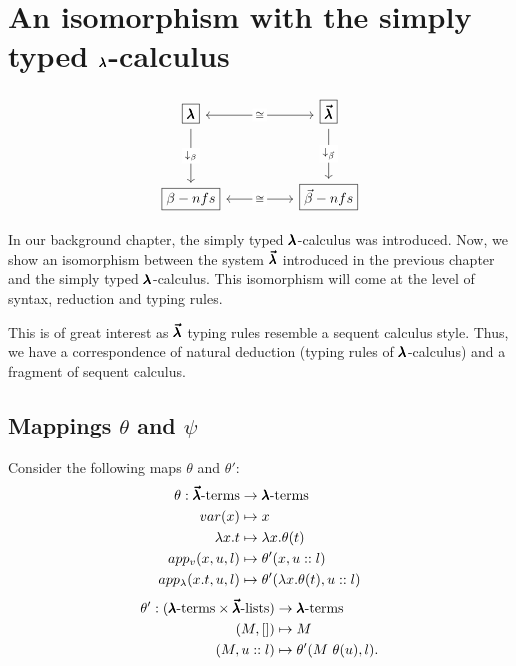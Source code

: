 \chapter{An isomorphism with the simply typed $\pmb{\lambda}$-calculus}
\label{c:isomorphism}
\[
  \begin{tikzcd}
    {\boxed \Lam} && {\boxed \LamV} \\
    \\
    {\boxed{\small{\beta-nfs}}} && {\boxed{\small{\vec \beta-nfs}}}
    \arrow["\cong"{description}, <->, from=1-1, to=1-3]
    \arrow["{\downarrow_\beta}"{description}, from=1-1, to=3-1]
    \arrow["{\downarrow_{\vec \beta}}"{description}, from=1-3, to=3-3]
    \arrow["\cong"{description}, <->, from=3-1, to=3-3]
  \end{tikzcd}
\]

In our background chapter, the simply typed $\pmb{\lambda}$-calculus was introduced.
Now, we show an isomorphism between the system $\pmb{\vec \lambda}$ introduced in the previous chapter and the simply typed $\pmb{\lambda}$-calculus.
This isomorphism will come at the level of syntax, reduction and typing rules.

This is of great interest as $\pmb{\vec \lambda}$ typing rules resemble a sequent calculus style. Thus, we have a correspondence of natural deduction (typing rules of $\pmb{\lambda}$-calculus) and a fragment of sequent calculus.

\section{Mappings $\theta$ and $\psi$}

\begin{definition}
  Consider the following maps $\theta$ and $\theta'$:
  \begin{align*}
    \theta : \pmb{\vec \lambda} \text{-terms} &\to \pmb{\lambda} \text{-terms} \\
    var(x) &\mapsto x \\
    \lambda x . t &\mapsto \lambda x . \theta(t) \\
    app_v (x, u, l) &\mapsto \theta'(x, u::l) \\
    app_\lambda (x. t, u, l) &\mapsto \theta'(\lambda x . \theta(t), u::l)
  \end{align*}
  \begin{align*}
    \theta' : (\pmb{\lambda} \text{-terms} \times \pmb{\vec \lambda} \text{-lists}) & \to \pmb{\lambda} \text{-terms} \\
    (M, []) &\mapsto M \\
    (M, u::l) &\mapsto \theta'(M \ \theta(u), l).
  \end{align*}
\end{definition}
  
